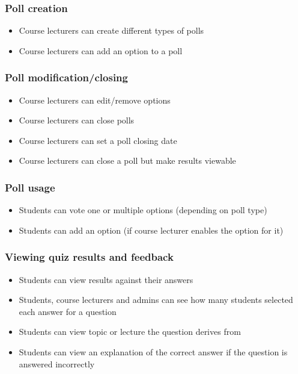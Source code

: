 \subsubsection{Poll creation}
\begin{itemize}
	\item Course lecturers can create different types of polls 
	\item Course lecturers can add an option to a poll
\end{itemize}

\subsubsection{Poll modification/closing}
\begin{itemize}
	\item Course lecturers can edit/remove options
	\item Course lecturers can close polls
	\item Course lecturers can set a poll closing date
	\item Course lecturers can close a poll but make results viewable
\end{itemize}

\subsubsection{Poll usage}
\begin{itemize}
	\item Students can vote one or multiple options (depending on poll type)
	\item Students can add an option (if course lecturer enables the option for it)
\end{itemize}

\subsubsection{Viewing quiz results and feedback}
\begin{itemize}
	\item Students can view results against their answers
	\item Students, course lecturers and admins can see how many students selected each answer for a question
	\item Students can view topic or lecture the question derives from
	\item Students can view an explanation of the correct answer if the question is answered incorrectly
\end{itemize}

